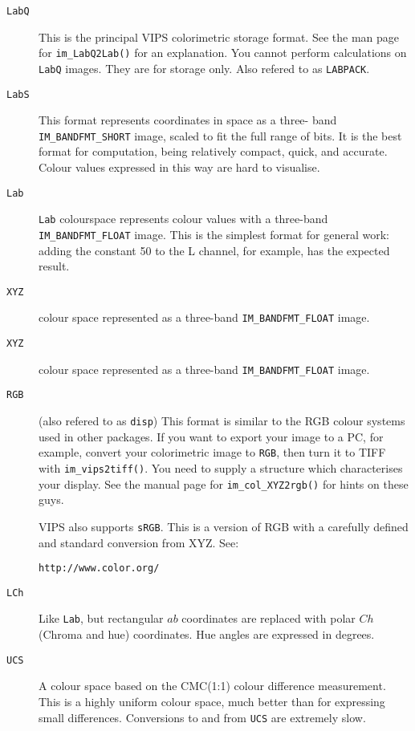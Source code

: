 \begin{description}

\item[\texttt{LabQ}]
This is the principal VIPS colorimetric storage format. See the
man page for \verb+im_LabQ2Lab()+ for an explanation. You cannot perform
calculations on \verb+LabQ+ images. They are for storage only. Also refered
to as \verb+LABPACK+.

\item[\texttt{LabS}]
This format represents coordinates in \cielab{} space as a three-
band \verb+IM_BANDFMT_SHORT+ image, scaled to fit the full range of bits. It is
the best format for computation, being relatively compact, quick, and
accurate. Colour values expressed in this way are hard to visualise.

\item[\texttt{Lab}]
\verb+Lab+ colourspace represents \cielab{} colour values with a three-band
\verb+IM_BANDFMT_FLOAT+ image. This is the simplest format for general work: adding the
constant 50 to the L channel, for example, has the expected result.

\item[\texttt{XYZ}]
\ciexyz{} colour space represented as a three-band \verb+IM_BANDFMT_FLOAT+
image.

\item[\texttt{XYZ}]
\cieyxy{} colour space represented as a three-band \verb+IM_BANDFMT_FLOAT+
image.

\item[\texttt{RGB}]
(also refered to as \verb+disp+) This format is similar to the RGB colour
systems used in other packages. If you want to export your image to a PC,
for example, convert your colorimetric image to \verb+RGB+, then turn it
to TIFF with \verb+im_vips2tiff()+. You need to supply a structure which
characterises your display. See the manual page for \verb+im_col_XYZ2rgb()+
for hints on these guys.

VIPS also supports \verb+sRGB+. This is a version of RGB with a carefully
defined and standard conversion from XYZ. See:

\begin{verbatim}
http://www.color.org/
\end{verbatim}

\item[\texttt{LCh}]
Like \verb+Lab+, but rectangular $ab$ coordinates are replaced with polar $Ch$
(Chroma and hue) coordinates. Hue angles are expressed in degrees.

\item[\texttt{UCS}]
A colour space based on the CMC(1:1) colour difference measurement. This
is a highly uniform colour space, much better than \cielab{} for expressing
small differences. Conversions to and from \verb+UCS+ are extremely slow.

\end{description}

